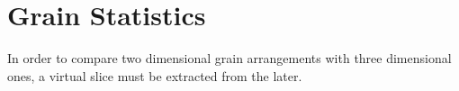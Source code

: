 \chapter{Grain Statistics}

In order to compare two dimensional grain arrangements with three dimensional ones, a virtual slice must be extracted from the later.